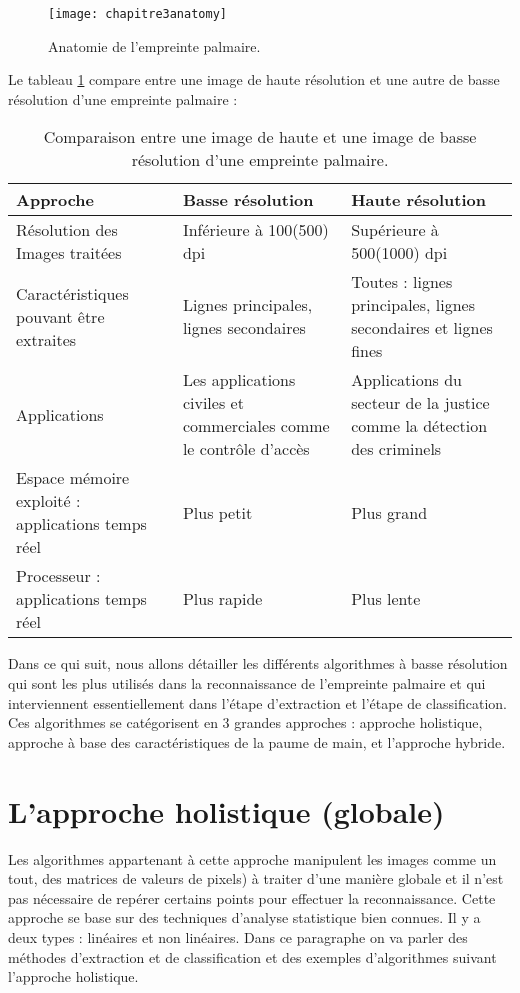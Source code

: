 \begin{center}
	\begin{figure}[H]
		\centering
		\texttt{[image: chapitre3anatomy]}
		\caption{Anatomie de l'empreinte palmaire.}
		\label{fig:chapitre3anatomy}
	\end{figure}
\end{center}
Le tableau \ref{tab:palmcomparaison} compare entre une image de haute résolution et une autre de basse résolution d’une empreinte palmaire :
\begin{table}[H]
	\centering
	\caption{Comparaison entre une image de haute et une image de basse résolution d’une empreinte palmaire.}
	\label{tab:palmcomparaison}
	\begin{tabular}{|p{5cm}|p{5cm}|p{5cm}|}
		\hline
		\textbf{Approche} & \textbf{Basse résolution} & \textbf{Haute résolution} \\ \hline
		Résolution des Images traitées & Inférieure à 100(500) dpi & Supérieure à 500(1000) dpi \\ \hline
		Caractéristiques pouvant être extraites & Lignes principales, lignes secondaires & Toutes : lignes principales, lignes secondaires et lignes fines \\ \hline
		Applications & Les applications civiles et commerciales comme le contrôle d’accès & Applications du secteur de la justice comme la détection des criminels \\ \hline
		Espace mémoire exploité : applications temps réel & Plus petit & Plus grand \\ \hline
		Processeur : applications temps réel & Plus rapide & Plus lente \\ \hline
	\end{tabular}
\end{table}
Dans ce qui suit, nous allons détailler les différents algorithmes à basse résolution qui sont les plus utilisés dans la reconnaissance de l’empreinte palmaire \citep{kong2002palmprint} et qui interviennent essentiellement dans l’étape d’extraction et l’étape de classification. Ces algorithmes se catégorisent en 3 grandes approches : approche holistique, approche à base des caractéristiques de la paume de main, et l’approche hybride.
\section{L’approche holistique (globale)}
Les algorithmes appartenant à cette approche manipulent les images comme un tout, des matrices de valeurs de pixels) à traiter d’une manière globale et il n’est pas nécessaire de repérer certains points \citep{meyer2009} pour effectuer la reconnaissance. Cette approche se base sur des techniques d’analyse statistique bien connues. Il y a deux types : linéaires et non linéaires. Dans ce paragraphe on va parler des méthodes d’extraction et de classification et des exemples d’algorithmes suivant l’approche holistique.
